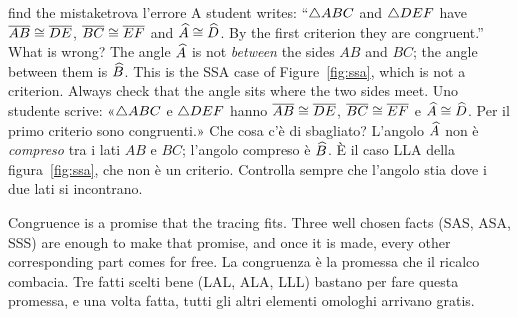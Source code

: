 \begin{think}{find the mistake}{trova l'errore}
A student writes: ``$\triangle ABC$ and $\triangle DEF$ have $\overline{AB} \cong \overline{DE}$, $\overline{BC} \cong \overline{EF}$ and $\widehat{A} \cong \widehat{D}$. By the first criterion they are congruent.'' What is wrong?
\answer The angle $\widehat{A}$ is not \emph{between} the sides $AB$ and $BC$; the angle between them is $\widehat{B}$. This is the SSA case of Figure~\ref{fig:ssa}, which is not a criterion. Always check that the angle sits where the two sides meet.
\tcblower
Uno studente scrive: «$\triangle ABC$ e $\triangle DEF$ hanno $\overline{AB} \cong \overline{DE}$, $\overline{BC} \cong \overline{EF}$ e $\widehat{A} \cong \widehat{D}$. Per il primo criterio sono congruenti.» Che cosa c'è di sbagliato?
\answer L'angolo $\widehat{A}$ non è \emph{compreso} tra i lati $AB$ e $BC$; l'angolo compreso è $\widehat{B}$. È il caso LLA della figura~\ref{fig:ssa}, che non è un criterio. Controlla sempre che l'angolo stia dove i due lati si incontrano.
\end{think}

\begin{keyidea}{}{}
Congruence is a promise that the tracing fits. Three well chosen facts (SAS, ASA, SSS) are enough to make that promise, and once it is made, every other corresponding part comes for free.
\tcblower
La congruenza è la promessa che il ricalco combacia. Tre fatti scelti bene (LAL, ALA, LLL) bastano per fare questa promessa, e una volta fatta, tutti gli altri elementi omologhi arrivano gratis.
\end{keyidea}
